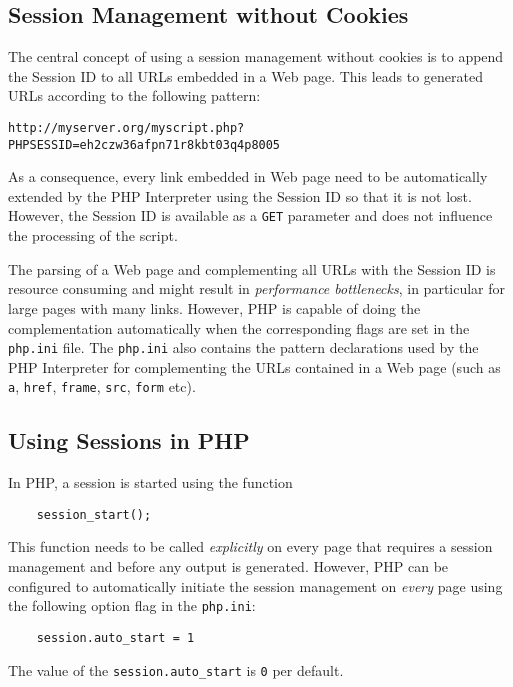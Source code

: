 \documentclass[a4paper, justified, notoc]{tufte-handout} %
\begin{document}
\subsection{Session Management without Cookies} %
\label{sub:session_without_cookies}
The central concept of using a session management without cookies is to append the Session ID to all URLs embedded in a Web page. This leads to generated URLs according to the following pattern:
\begin{Verbatim}
http://myserver.org/myscript.php?PHPSESSID=eh2czw36afpn71r8kbt03q4p8005
\end{Verbatim}  
As a consequence, every link embedded in Web page need to be automatically extended by the PHP Interpreter using the Session ID so that it is not lost. %
However, the Session ID is available as a \texttt{GET} parameter and does not influence the processing of the script.

The parsing of a Web page and complementing all URLs with the Session ID is resource consuming and might result in \emph{performance bottlenecks}, in particular for large pages with many links.
However, PHP is capable of doing the complementation automatically when the corresponding flags are set in the \texttt{php.ini} file. The \texttt{php.ini} also contains the pattern declarations used by the PHP Interpreter for complementing the URLs contained in a Web page (such as \texttt{a}, \texttt{href}, \texttt{frame}, \texttt{src}, \texttt{form} etc).


\subsection{Using Sessions in PHP} %
\label{sub:using_sessions_in_php}
In PHP, a session is started using the function
\begin{Verbatim}
  	session_start();
\end{Verbatim}  
This function needs to be called \emph{explicitly} on every page that requires a session management and before any output is generated.
However, PHP can be configured to automatically initiate the session management on \emph{every} page using the following option flag in the \texttt{php.ini}:
\begin{Verbatim}
	session.auto_start = 1
\end{Verbatim} 
The value of the \texttt{session.auto\_start} is \texttt{0} per default. 
\end{document}
